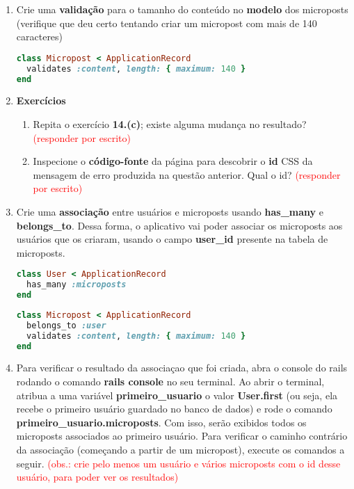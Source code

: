 \documentclass[a4paper,12pt]{article}
\begin{document}
\begin{enumerate}
  \item Crie uma \textbf{validação} para o tamanho do conteúdo no \textbf{modelo} dos microposts (verifique que deu certo tentando criar um micropost com mais de 140 caracteres)

    \begin{lstlisting}[language=Ruby, title=app/models/micropost.rb]
class Micropost < ApplicationRecord
  validates :content, length: { maximum: 140 }
end
    \end{lstlisting}

  \item \textbf{Exercícios}

    \begin{enumerate}
      \item Repita o exercício \textbf{14.(c)}; existe alguma mudança no resultado? \textcolor{red}{(responder por escrito)}
      \item Inspecione o \textbf{código-fonte} da página para descobrir o \textbf{id} CSS da mensagem de erro produzida na questão anterior. Qual o id? \textcolor{red}{(responder por escrito)}
    \end{enumerate}

  \item Crie uma \textbf{associação} entre usuários e microposts usando \textbf{has\_many} e \textbf{belongs\_to}. Dessa forma, o aplicativo vai poder associar os microposts aos usuários que os criaram, usando o campo \textbf{user\_id} presente na tabela de microposts.

    \begin{lstlisting}[language=Ruby, title=app/models/user.rb]
class User < ApplicationRecord
  has_many :microposts
end
    \end{lstlisting}

    \begin{lstlisting}[language=Ruby, title=app/models/micropost.rb]
class Micropost < ApplicationRecord
  belongs_to :user
  validates :content, length: { maximum: 140 }
end
    \end{lstlisting}

  \item Para verificar o resultado da associaçao que foi criada, abra o console do rails rodando o comando \textbf{rails console} no seu terminal. Ao abrir o terminal, atribua a uma variável \textbf{primeiro\_usuario} o valor \textbf{User.first} (ou seja, ela recebe o primeiro usuário guardado no banco de dados) e rode o comando \textbf{primeiro\_usuario.microposts}. Com isso, serão exibidos todos os microposts associados ao primeiro usuário. Para verificar o caminho contrário da associação (começando a partir de um micropost), execute os comandos a seguir. \textcolor{red}{(obs.: crie pelo menos um usuário e vários microposts com o id desse usuário, para poder ver os resultados)}


\end{enumerate}
\end{document}
